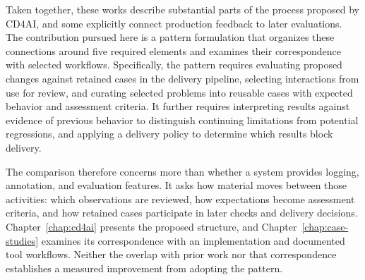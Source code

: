 Taken together, these works describe substantial parts of the process proposed
by CD4AI, and some explicitly connect production feedback to later evaluations.
The contribution pursued here is a pattern formulation that organizes these
connections around five required elements and examines their correspondence
with selected workflows. Specifically, the pattern requires evaluating proposed
changes against retained cases in the delivery pipeline, selecting interactions
from use for review, and curating selected problems into reusable cases with
expected behavior and assessment criteria. It further requires interpreting
results against evidence of previous behavior to distinguish continuing
limitations from potential regressions, and applying a delivery policy to
determine which results block delivery.

The comparison therefore concerns more than whether a system provides logging,
annotation, and evaluation features. It asks how material moves between those
activities: which observations are reviewed, how expectations become assessment
criteria, and how retained cases participate in later checks and delivery
decisions. Chapter~\ref{chap:cd4ai} presents the proposed structure, and
Chapter~\ref{chap:case-studies} examines its correspondence with an
implementation and documented tool workflows. Neither the overlap with prior
work nor that correspondence establishes a measured improvement from adopting
the pattern.

